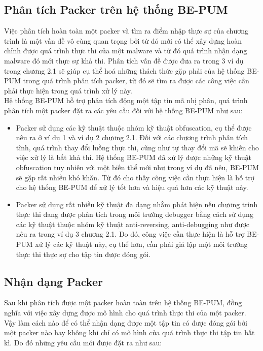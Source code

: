 \subsection {Phân tích Packer trên hệ thống BE-PUM}

\hspace{0.5cm}Việc phân tích hoàn toàn một packer và tìm ra điểm nhập thực sự của chương trình là một vấn đề vô cùng quan trọng bởi từ đó mới có thể xây dựng hoàn chỉnh được quá trình thực thi của một malware và từ đó quá trình nhận dạng malware đó mới thực sự khả thi. Phân tích vấn đề được đưa ra trong 3 ví dụ trong chương 2.1 sẽ giúp cụ thể hoá những thách thức gặp phải của hệ thống BE-PUM trong quá trình phân tích packer, từ đó sẽ tìm ra được các công việc cần phải thực hiện trong quá trình xử lý này.\\

\hspace{0.5cm}Hệ thống BE-PUM hỗ trợ phân tích động một tập tin mã nhị phân, quá trình phân tích một packer đặt ra các yêu cầu đối với hệ thống BE-PUM như sau:

\begin{itemize}
\item{Packer sử dụng các kỹ thuật thuộc nhóm kỹ thuật obfuscation, cụ thể được nêu ra ở ví dụ 1 và ví dụ 2 chương 2.1. Đối với các chương trình phân tích tĩnh, quá trình thay đổi luồng thực thi, cũng như tự thay đổi mã sẽ khiến cho việc xử lý là bất khả thi. Hệ thống BE-PUM đã xử lý được những kỹ thuật obfuscation tuy nhiên với một biến thể mới như trong ví dụ đã nêu, BE-PUM sẽ gặp rất nhiều khó khăn. Từ đó cho thấy công việc cần thực hiện là hỗ trợ cho hệ thống BE-PUM để xử lý tốt hơn và hiệu quả hơn các kỹ thuật này.\\}
\item{Packer sử dụng rất nhiều kỹ thuật đa dạng nhằm phát hiện nếu chương trình thực thi đang được phân tích trong môi trường debugger bằng cách sử dụng các kỹ thuật thuộc nhóm kỹ thuật anti-reversing, anti-debugging như được nêu ra trong ví dụ 3 chương 2.1. Do đó, công việc cần thực hiện là hỗ trợ BE-PUM xử lý các kỹ thuật này, cụ thể hơn, cần phải giả lập một môi trường thực thi thực sự cho tập tin được đóng gói.}
\end{itemize}

\subsection {Nhận dạng Packer}

\hspace{0.5cm}Sau khi phân tích được một packer hoàn toàn trên hệ thống BE-PUM, đồng nghĩa với việc xây dựng được mô hình cho quá trình thực thi của một packer. Vậy làm cách nào để có thể nhận dạng được một tập tin có được đóng gói bởi một packer nào hay không khi chỉ có mô hình của quá trình thực thi tập tin bất kì. Do đó những yêu cầu mới được đặt ra như sau:

